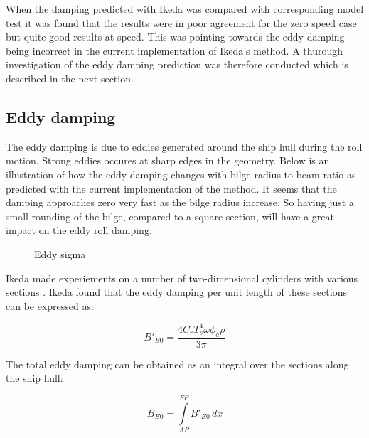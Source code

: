     When the damping predicted with Ikeda was compared with corresponding
model test it was found that the results were in poor agreement for the
zero speed case but quite good results at speed. This was pointing
towards the eddy damping being incorrect in the current implementation
of Ikeda's method. A thurough investigation of the eddy damping
prediction was therefore conducted which is described in the next
section.

    \subsection{Eddy damping}\label{eddy-damping}

The eddy damping is due to eddies generated around the ship hull during
the roll motion. Strong eddies occures at sharp edges in the geometry.
Below is an illustration of how the eddy damping changes with bilge
radius to beam ratio as predicted with the current implementation of the
method. It seems that the damping approaches zero very fast as the bilge
radius increase. So having just a small rounding of the bilge, compared
to a square section, will have a great impact on the eddy roll damping.

    \begin{figure}
        \begin{center}\end{center}
        \caption{Eddy sigma}
        \label{fig:eddy_sigma}
    \end{figure}
    
    Ikeda made experiements on a number of two-dimensional cylinders with
various sections \cite{7505983/4AFVVGNT}. Ikeda found that the eddy
damping per unit length of these sections can be expressed as:
 
            
    
    \begin{equation}
B'_{E0} = \frac{4 C_{r} T_{s}^{4} \omega \phi_{a} \rho}{3 \pi}
\label{eq:equation}
\end{equation}

    

    The total eddy damping can be obtained as an integral over the sections
along the ship hull:
 
            
    
    \begin{equation}
B_{E0} = \int\limits_{AP}^{FP} B'_{E0}\, dx
\label{eq:equation}
\end{equation}

